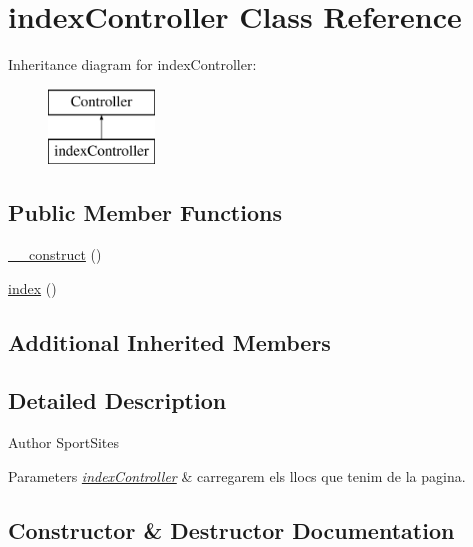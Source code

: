 \hypertarget{classindex_controller}{}\section{index\+Controller Class Reference}
\label{classindex_controller}
Inheritance diagram for index\+Controller\+:\begin{figure}[H]
\begin{center}
\leavevmode
\includegraphics[height=2.000000cm]{classindex_controller}
\end{center}
\end{figure}
\subsection*{Public Member Functions}
\begin{DoxyCompactItemize}
\item 
\hyperlink{classindex_controller_a095c5d389db211932136b53f25f39685}{\+\_\+\+\_\+construct} ()
\item 
\hyperlink{classindex_controller_a149eb92716c1084a935e04a8d95f7347}{index} ()
\end{DoxyCompactItemize}
\subsection*{Additional Inherited Members}


\subsection{Detailed Description}
\begin{DoxyAuthor}{Author}
Sport\+Sites 
\end{DoxyAuthor}

\begin{DoxyParams}{Parameters}
{\em \hyperlink{classindex_controller}{index\+Controller}} & carregarem els llocs que tenim de la pagina. \\
\hline
\end{DoxyParams}


\subsection{Constructor \& Destructor Documentation}
\hypertarget{classindex_controller_a095c5d389db211932136b53f25f39685}{}
